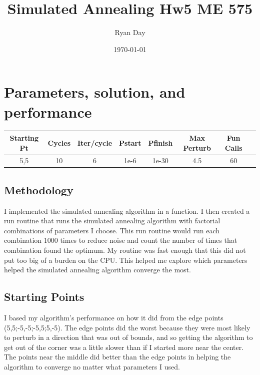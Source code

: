 \documentclass[a4paper]{article}
\title{Simulated Annealing Hw5 ME 575}
\author{Ryan Day}
\date{\today}
\begin{document}
    \maketitle
    \section{Parameters, solution, and performance}
    \begin{center}
        \begin{tabular}{ |c |c |c |c | c| c| c| c| }
            \hline
          Starting Pt & Cycles & Iter/cycle & Pstart & Pfinish & Max Perturb & Fun Calls   \\ \hline
         5,5 & 10 & 6 & 1e-6 & 1e-30 & 4.5 & 60\\  \hline
        \end{tabular}
    \end{center}
    \subsection{Methodology}
    I implemented the simulated annealing algorithm in a function. 
    I then created a run routine that runs the simulated annealing algorithm with factorial combinations of parameters I choose.
    This run routine would run each combination 1000 times to reduce noise and count the number of times that combination found the optimum.
    My routine was fast enough that this did not put too big of a burden on the CPU.
    This helped me explore which parameters helped the simulated annealing algorithm converge the most.
    \subsection{Starting Points}
    I based my algorithm's performance on how it did from the edge points (5,5;-5,-5;-5,5;5,-5). 
    The edge points did the worst because they were most likely to perturb in a direction that was out of bounds, and so getting the algorithm to get out of the corner was a little slower than if I started more near the center.
    The points near the middle did better than the edge points in helping the algorithm to converge no matter what parameters I used.
\end{document}
